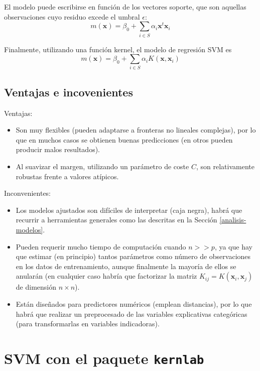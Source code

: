 \documentclass[
  spanish,
]{book}
\theoremstyle{break}
\theoremstyle{definition}
\theoremstyle{definition}
\theoremstyle{definition}
\theoremstyle{remark}
\begin{document}
El modelo puede escribirse en función de los vectores soporte, que son aquellas observaciones cuyo residuo excede el umbral \(\epsilon\):
\[m(\mathbf{x}) = \beta_0 + \sum_{i\in S} \alpha_i \mathbf{x}^t \mathbf{x}_i\]

Finalmente, utilizando una función kernel, el modelo de regresión SVM es
\[m(\mathbf{x}) = \beta_0 + \sum_{i\in S} \alpha_i K(\mathbf{x}, \mathbf{x}_i)\]

\hypertarget{ventajas-e-incovenientes}{%
\subsection{Ventajas e incovenientes}\label{ventajas-e-incovenientes}}

Ventajas:

\begin{itemize}
\item
  Son muy flexibles (pueden adaptarse a fronteras no lineales complejas), por lo que en muchos casos se obtienen buenas predicciones (en otros pueden producir malos resultados).
\item
  Al suavizar el margen, utilizando un parámetro de coste \(C\), son relativamente robustas frente a valores atípicos.
\end{itemize}

Inconvenientes:

\begin{itemize}
\item
  Los modelos ajustados son difíciles de interpretar (caja negra), habrá que recurrir a herramientas generales como las descritas en la Sección \ref{analisis-modelos}.
\item
  Pueden requerir mucho tiempo de computación cuando \(n >> p\), ya que hay que estimar (en principio) tantos parámetros como número de observaciones en los datos de entrenamiento, aunque finalmente la mayoría de ellos se anularán (en cualquier caso habría que factorizar la matriz \(K_{ij} = K(\mathbf{x}_i, \mathbf{x}_j)\) de dimensión \(n \times n\)).
\item
  Están diseñados para predictores numéricos (emplean distancias), por lo que habrá que realizar un preprocesado de las variables explicativas categóricas (para transformarlas en variables indicadoras).
\end{itemize}

\hypertarget{svm-con-el-paquete-kernlab}{%
\section{\texorpdfstring{SVM con el paquete \texttt{kernlab}}{SVM con el paquete kernlab}}\label{svm-con-el-paquete-kernlab}}
\end{document}
